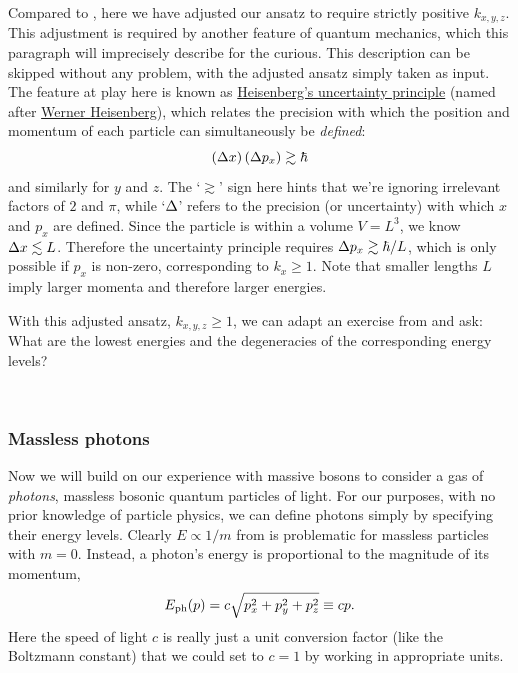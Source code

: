 Compared to , here we have adjusted our ansatz to require strictly positive $k_{x, y, z}$.
This adjustment is required by another feature of quantum mechanics, which this paragraph will imprecisely describe for the curious.
This description can be skipped without any problem, with the adjusted ansatz simply taken as input.
The feature at play here is known as \href{https://en.wikipedia.org/wiki/Uncertainty_principle}{Heisenberg's uncertainty principle} (named after \href{https://en.wikipedia.org/wiki/Werner_Heisenberg}{Werner Heisenberg}), which relates the precision with which the position and momentum of each particle can simultaneously be \emph{defined}:
\begin{equation*}
  \left(\Delta x\right) \left(\Delta p_x\right) \gtrsim \hbar
\end{equation*}
and similarly for $y$ and $z$.
The `$\gtrsim$' sign here hints that we're ignoring irrelevant factors of $2$ and $\pi$, while `$\Delta$' refers to the precision (or uncertainty) with which $x$ and $p_x$ are defined.
Since the particle is within a volume $V = L^3$, we know $\Delta x \lesssim L$.
Therefore the uncertainty principle requires $\Delta p_x \gtrsim \hbar / L$, which is only possible if $p_x$ is non-zero, corresponding to $k_x \geq 1$.
Note that smaller lengths $L$ imply larger momenta and therefore larger energies.

With this adjusted ansatz, $k_{x, y, z} \geq 1$, we can adapt an exercise from  and ask: What are the lowest energies and the degeneracies of the corresponding energy levels?
\begin{mdframed}
  \ \\[100 pt]
\end{mdframed}

\subsubsection{Massless photons}
Now we will build on our experience with massive bosons to consider a gas of \textit{photons}, massless bosonic quantum particles of light.
For our purposes, with no prior knowledge of particle physics, we can define photons simply by specifying their energy levels.
Clearly $E \propto 1 / m$ from  is problematic for massless particles with $m = 0$.
Instead, a photon's energy is proportional to the magnitude of its momentum,
\begin{equation*}
  E_{\text{ph}}(p) = c \sqrt{p_x^2 + p_y^2 + p_z^2} \equiv c p.
\end{equation*}
Here the speed of light $c$ is really just a unit conversion factor (like the Boltzmann constant) that we could set to $c = 1$ by working in appropriate units.

